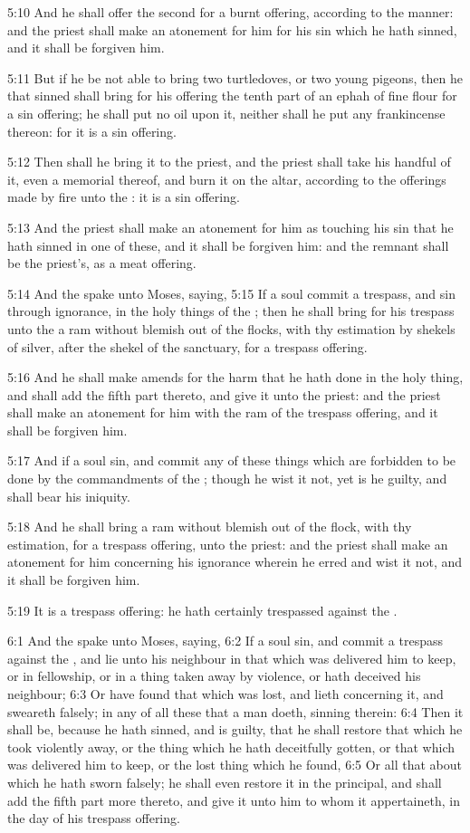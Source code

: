 5:10 And he shall offer the second for a burnt offering, according to
the manner: and the priest shall make an atonement for him for his sin
which he hath sinned, and it shall be forgiven him.

5:11 But if he be not able to bring two turtledoves, or two young
pigeons, then he that sinned shall bring for his offering the tenth
part of an ephah of fine flour for a sin offering; he shall put no oil
upon it, neither shall he put any frankincense thereon: for it is a
sin offering.

5:12 Then shall he bring it to the priest, and the priest shall take
his handful of it, even a memorial thereof, and burn it on the altar,
according to the offerings made by fire unto the \LORD: it is a sin
offering.

5:13 And the priest shall make an atonement for him as touching his
sin that he hath sinned in one of these, and it shall be forgiven him:
and the remnant shall be the priest's, as a meat offering.

5:14 And the \LORD spake unto Moses, saying, 5:15 If a soul commit a
trespass, and sin through ignorance, in the holy things of the \LORD;
then he shall bring for his trespass unto the \LORD a ram without
blemish out of the flocks, with thy estimation by shekels of silver,
after the shekel of the sanctuary, for a trespass offering.

5:16 And he shall make amends for the harm that he hath done in the
holy thing, and shall add the fifth part thereto, and give it unto the
priest: and the priest shall make an atonement for him with the ram of
the trespass offering, and it shall be forgiven him.

5:17 And if a soul sin, and commit any of these things which are
forbidden to be done by the commandments of the \LORD; though he wist
it not, yet is he guilty, and shall bear his iniquity.

5:18 And he shall bring a ram without blemish out of the flock, with
thy estimation, for a trespass offering, unto the priest: and the
priest shall make an atonement for him concerning his ignorance
wherein he erred and wist it not, and it shall be forgiven him.

5:19 It is a trespass offering: he hath certainly trespassed against
the \LORD.

6:1 And the \LORD spake unto Moses, saying, 6:2 If a soul sin, and
commit a trespass against the \LORD, and lie unto his neighbour in that
which was delivered him to keep, or in fellowship, or in a thing taken
away by violence, or hath deceived his neighbour; 6:3 Or have found
that which was lost, and lieth concerning it, and sweareth falsely; in
any of all these that a man doeth, sinning therein: 6:4 Then it shall
be, because he hath sinned, and is guilty, that he shall restore that
which he took violently away, or the thing which he hath deceitfully
gotten, or that which was delivered him to keep, or the lost thing
which he found, 6:5 Or all that about which he hath sworn falsely; he
shall even restore it in the principal, and shall add the fifth part
more thereto, and give it unto him to whom it appertaineth, in the day
of his trespass offering.

